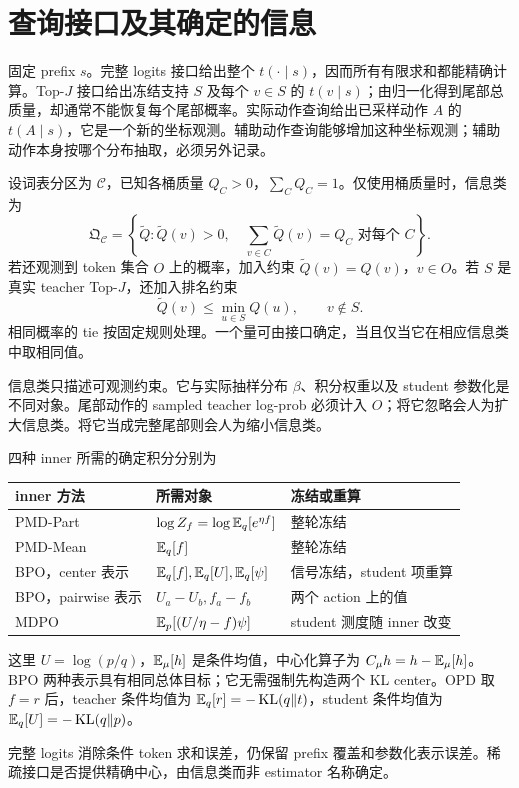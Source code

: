 \section{查询接口及其确定的信息}
\label{inf:access}

固定 prefix $s$。完整 logits 接口给出整个 $t(\cdot\mid s)$，因而所有有限求和都能精确计算。Top-$J$ 接口给出冻结支持 $S$ 及每个 $v\in S$ 的 $t(v\mid s)$；由归一化得到尾部总质量，却通常不能恢复每个尾部概率。实际动作查询给出已采样动作 $A$ 的 $t(A\mid s)$，它是一个新的坐标观测。辅助动作查询能够增加这种坐标观测；辅助动作本身按哪个分布抽取，必须另外记录。

\begin{definition}[与观测一致的参考分布]
\label{inf:compatible}
设词表分区为 $\mathcal C$，已知各桶质量 $Q_C>0$，$\sum_CQ_C=1$。仅使用桶质量时，信息类为
\begin{equation}
\mathfrak Q_{\mathcal C}=\left\{\widetilde Q:\widetilde Q(v)>0,\quad \sum_{v\in C}\widetilde Q(v)=Q_C\text{ 对每个 }C\right\}.
\end{equation}
若还观测到 token 集合 $O$ 上的概率，加入约束 $\widetilde Q(v)=Q(v)$，$v\in O$。若 $S$ 是真实 teacher Top-$J$，还加入排名约束
\begin{equation}
\widetilde Q(v)\leq\min_{u\in S}Q(u),\qquad v\notin S.
\end{equation}
相同概率的 tie 按固定规则处理。一个量可由接口确定，当且仅当它在相应信息类中取相同值。
\end{definition}

信息类只描述可观测约束。它与实际抽样分布 $\beta$、积分权重以及 student 参数化是不同对象。尾部动作的 sampled teacher log-prob 必须计入 $O$；将它忽略会人为扩大信息类。将它当成完整尾部则会人为缩小信息类。

四种 inner 所需的确定积分分别为
\begin{center}
\begin{tabular}{lll}
\toprule
inner 方法 & 所需对象 & 冻结或重算\\
\midrule
PMD-Part & $\log Z_f=\log\mathbb E_q[e^{\eta f}]$ & 整轮冻结\\
PMD-Mean & $\mathbb E_q[f]$ & 整轮冻结\\
BPO，center 表示 & $\mathbb E_q[f],\mathbb E_q[U],\mathbb E_q[\psi]$ & 信号冻结，student 项重算\\
BPO，pairwise 表示 & $U_a-U_b, f_a-f_b$ & 两个 action 上的值\\
MDPO & $\mathbb E_p[(U/\eta-f)\psi]$ & student 测度随 inner 改变\\
\bottomrule
\end{tabular}
\end{center}
这里 $U=\log(p/q)$，$\mathbb E_\mu[h]$ 是条件均值，中心化算子为 $C_\mu h=h-\mathbb E_\mu[h]$。BPO 两种表示具有相同总体目标；它无需强制先构造两个 KL center。OPD 取 $f=r$ 后，teacher 条件均值为 $\mathbb E_q[r]=-\operatorname{KL}(q\Vert t)$，student 条件均值为 $\mathbb E_q[U]=-\operatorname{KL}(q\Vert p)$。

完整 logits 消除条件 token 求和误差，仍保留 prefix 覆盖和参数化表示误差。稀疏接口是否提供精确中心，由信息类而非 estimator 名称确定。
